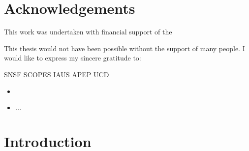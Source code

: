 \documentclass[11pt]{report}
\begin{document}
\chapter*{Acknowledgements}
This work was undertaken with financial support of the 

This thesis would not have been possible without the support of many people. I would like to express my sincere gratitude to:

SNSF
SCOPES
IAUS
APEP UCD

\begin{itemize}
\item 
\item ...
\end{itemize}




\chapter{Introduction}
\end{document}
